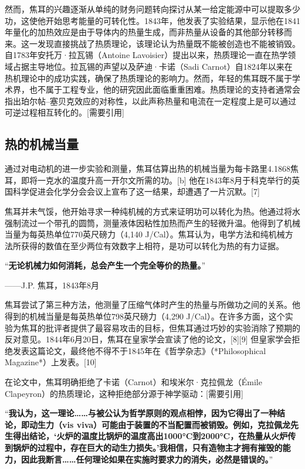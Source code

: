 然而，焦耳的兴趣逐渐从单纯的财务问题转向探讨从某一给定能源中可以提取多少功，这使他开始思考能量的可转化性。1843年，他发表了实验结果，显示他在1841年量化的加热效应是由于导体内的热量生成，而非热量从设备的其他部分转移而来。这一发现直接挑战了热质理论，该理论认为热量既不能被创造也不能被销毁。自1783年安托万·拉瓦锡（Antoine Lavoisier）提出以来，热质理论一直在热学领域占据主导地位。拉瓦锡的声望以及萨迪·卡诺（Sadi Carnot）自1824年以来在热机理论中的成功实践，确保了热质理论的影响力。然而，年轻的焦耳既不属于学术界，也不属于工程专业，他的研究因此面临重重困难。热质理论的支持者通常会指出珀尔帖–塞贝克效应的对称性，以此声称热量和电流在一定程度上是可以通过可逆过程相互转化的。[需要引用]  

\subsection{热的机械当量}  
通过对电动机的进一步实验和测量，焦耳估算出热的机械当量为每卡路里4.1868焦耳，即将一克水的温度升高一开尔文所需的功。[b] 他在1843年8月于科克举行的英国科学促进会化学分会会议上宣布了这一结果，却遭遇了一片沉默。[7]  

焦耳并未气馁，他开始寻求一种纯机械的方式来证明功可以转化为热。他通过将水强制流过一个带孔的圆筒，测量液体因粘性加热而产生的轻微升温。他得到了机械当量为每英热单位770英尺磅力（4,140 J/Cal）。焦耳认为，电学方法和纯机械方法所获得的数值在至少两位有效数字上相符，是功可以转化为热的有力证据。  

“\textbf{无论机械力如何消耗，总会产生一个完全等价的热量。}”

——J.P. 焦耳，1843年8月  

焦耳尝试了第三种方法，他测量了压缩气体时产生的热量与所做功之间的关系。他得到的机械当量是每英热单位798英尺磅力（4,290 J/Cal）。在许多方面，这个实验为焦耳的批评者提供了最容易攻击的目标，但焦耳通过巧妙的实验消除了预期的反对意见。1844年6月20日，焦耳在皇家学会宣读了他的论文，[8][9] 但皇家学会拒绝发表这篇论文，最终他不得不于1845年在《哲学杂志》（*Philosophical Magazine*）上发表。[10]  

在论文中，焦耳明确拒绝了卡诺（Carnot）和埃米尔·克拉佩龙（Émile Clapeyron）的热质理论，这种拒绝部分源于神学驱动：[需要引用]  

“\textbf{我认为，这一理论……与被公认为哲学原则的观点相悖，因为它得出了一种结论，即动生力（vis viva）可能由于装置的不当配置而被销毁。例如，克拉佩龙先生得出结论，‘火炉的温度比锅炉的温度高出1000°C到2000°C，在热量从火炉传到锅炉的过程中，存在巨大的动生力损失。’我相信，只有造物主才拥有摧毁的能力，因此我断言……任何理论如果在实施时要求力的消失，必然是错误的。}”

